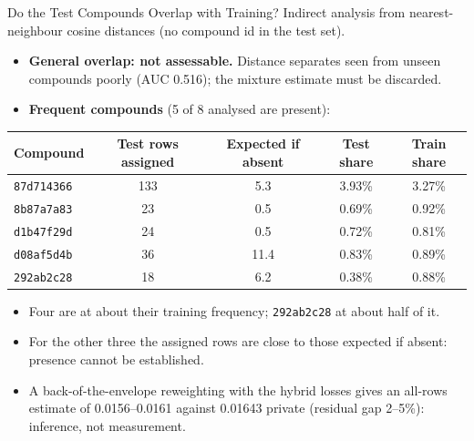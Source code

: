 \documentclass[aspectratio=169,10pt]{beamer}
\begin{document}
\begin{frame}{Do the Test Compounds Overlap with Training?}
\small
Indirect analysis from nearest-neighbour cosine distances (no compound id in the test set).
\begin{itemize}
  \item \textbf{General overlap: not assessable.} Distance separates seen from unseen compounds poorly (AUC 0.516); the mixture estimate must be discarded.
  \item \textbf{Frequent compounds} (5 of 8 analysed are present):
\end{itemize}
\vspace{0.2em}

\centering
\scriptsize
\begin{tabular}{lcccc}
\toprule
\textbf{Compound} & \textbf{Test rows assigned} & \textbf{Expected if absent} & \textbf{Test share} & \textbf{Train share}\\
\midrule
\texttt{87d714366} & 133 & 5.3 & 3.93\% & 3.27\%\\
\texttt{8b87a7a83} & 23 & 0.5 & 0.69\% & 0.92\%\\
\texttt{d1b47f29d} & 24 & 0.5 & 0.72\% & 0.81\%\\
\texttt{d08af5d4b} & 36 & 11.4 & 0.83\% & 0.89\%\\
\texttt{292ab2c28} & 18 & 6.2 & 0.38\% & 0.88\%\\
\bottomrule
\end{tabular}

\vspace{0.4em}
\raggedright\small
\begin{itemize}
  \item Four are at about their training frequency; \texttt{292ab2c28} at about half of it.
  \item For the other three the assigned rows are close to those expected if absent: presence cannot be established.
  \item A back-of-the-envelope reweighting with the hybrid losses gives an all-rows estimate of 0.0156--0.0161 against 0.01643 private (residual gap 2--5\%): inference, not measurement.
\end{itemize}
\end{frame}
\end{document}
